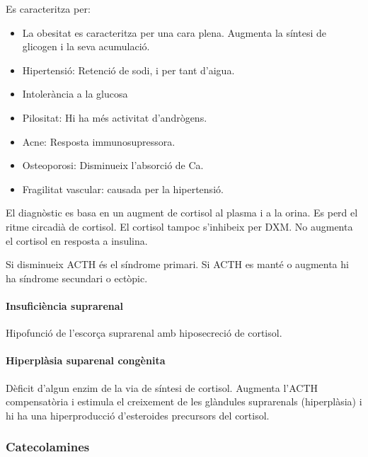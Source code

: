 Es caracteritza per:
\begin{itemize}
\item La obesitat es caracteritza per una cara plena. Augmenta la síntesi de
glicogen i la seva acumulació.

\item Hipertensió: Retenció de sodi, i per tant d'aigua.

\item Intolerància a la glucosa

\item Pilositat: Hi ha més activitat d'andrògens.

\item Acne: Resposta immunosupressora.

\item Osteoporosi: Disminueix l'absorció de Ca.

\item Fragilitat vascular: causada per la hipertensió.
\end{itemize}

El diagnòstic es basa en un augment de cortisol al plasma i a la
orina. Es perd el ritme circadià de cortisol. El cortisol tampoc
s'inhibeix per DXM. No augmenta el cortisol en resposta a insulina.

Si disminueix ACTH és el síndrome primari. Si ACTH es manté o augmenta
hi ha síndrome secundari o ectòpic.


\paragraph{Insuficiència suprarenal}
Hipofunció de l'escorça suprarenal amb hiposecreció de cortisol.

\paragraph{Hiperplàsia suparenal congènita}
Dèficit d'algun enzim de la via de síntesi de cortisol. Augmenta
l'ACTH compensatòria i estimula el creixement de les glàndules
suprarenals (hiperplàsia) i hi ha una hiperproducció d'esteroides
precursors del cortisol.

\subsubsection{Catecolamines}
\label{sec:catecolamines}

